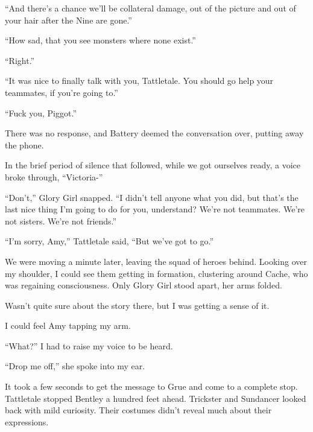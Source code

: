 ``And there's a chance we'll be collateral damage, out of the picture and out of your hair after the Nine are gone.''



``How sad, that you see monsters where none exist.''



``Right.''



``It was nice to finally talk with you, Tattletale.  You should go help your teammates, if you're going to.''



``Fuck you, Piggot.''



There was no response, and Battery deemed the conversation over, putting away the phone.



In the brief period of silence that followed, while we got ourselves ready, a voice broke through, ``Victoria-''



``Don't,'' Glory Girl snapped.  ``I didn't tell anyone what you did, but that's the last nice thing I'm going to do for you, understand?  We're not teammates.  We're not sisters.  We're not friends.''



``I'm sorry, Amy,'' Tattletale said, ``But we've got to go.''



We were moving a minute later, leaving the squad of heroes behind.  Looking over my shoulder, I could see them getting in formation, clustering around Cache, who was regaining consciousness.  Only Glory Girl stood apart, her arms folded.



Wasn't quite sure about the story there, but I was getting a sense of it.



I could feel Amy tapping my arm.



``What?'' I had to raise my voice to be heard.



``Drop me off,'' she spoke into my ear.



It took a few seconds to get the message to Grue and come to a complete stop.  Tattletale stopped Bentley a hundred feet ahead.  Trickster and Sundancer looked back with mild curiosity.  Their costumes didn't reveal much about their expressions.



